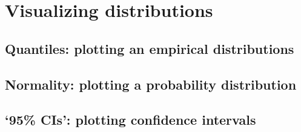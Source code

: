 %
%
%
\section{Visualizing distributions}


	\subsection{Quantiles: plotting an empirical distributions}


	\subsection{Normality: plotting a probability distribution}
  

  \subsection{`95\% CIs': plotting confidence intervals}

